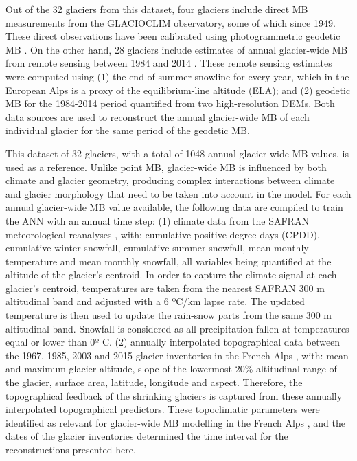 Out of the 32 glaciers from this dataset, four glaciers include direct MB measurements from the GLACIOCLIM observatory, some of which since 1949. These direct observations have been calibrated using photogrammetric geodetic MB \citep{vincent_common_2017}. On the other hand, 28 glaciers include estimates of annual glacier-wide MB from remote sensing between 1984 and 2014 \citep{rabatel_spatio-temporal_2016}. These remote sensing estimates were computed using (1) the end-of-summer snowline for every year, which in the European Alps is a proxy of the equilibrium-line altitude (ELA); and (2) geodetic MB for the 1984-2014 period quantified from two high-resolution DEMs. Both data sources are used to reconstruct the annual glacier-wide MB of each individual glacier for the same period of the geodetic MB. 

This dataset of 32 glaciers, with a total of 1048 annual glacier-wide MB values, is used as a reference. Unlike point MB, glacier-wide MB is influenced by both climate and glacier geometry, producing complex interactions between climate and glacier morphology that  need to be taken into account in the model. For each annual glacier-wide MB value available, the following data are compiled to train the ANN with an annual time step: (1) climate data from the SAFRAN meteorological reanalyses \citep{durand_reanalysis_2009}, with: cumulative positive degree days (CPDD), cumulative winter snowfall, cumulative summer snowfall, mean monthly temperature and mean monthly snowfall, all variables being quantified at the altitude of the glacier's centroid. In order to capture the climate signal at each glacier's centroid, temperatures are taken from the nearest SAFRAN 300 m altitudinal band and adjusted with a 6 ºC/km lapse rate. The updated temperature is then used to update the rain-snow parts from the same 300 m altitudinal band. Snowfall is considered as all precipitation fallen at temperatures equal or lower than 0º C. (2) annually interpolated topographical data between the 1967, 1985, 2003 and 2015 glacier inventories in the French Alps \citep[update of][]{gardent_multitemporal_2014}, with: mean and maximum glacier altitude, slope of the lowermost 20\% altitudinal range of the glacier, surface area, latitude, longitude and aspect. Therefore, the topographical feedback of the shrinking glaciers is captured from these annually interpolated topographical predictors. These topoclimatic parameters were identified as relevant for glacier-wide MB modelling in the French Alps \citep{bolibar_deep_2020-1}, and the dates of the glacier inventories determined the time interval for the reconstructions presented here.

